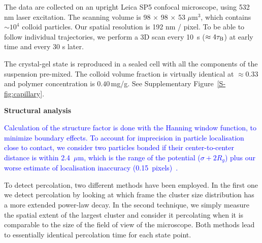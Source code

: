\documentclass[preprint,amsmath,amssymb,superscriptaddress]{revtex4-1}
\begin{document}
The data are collected on an upright Leica SP5 confocal microscope, using 532 nm laser excitation. The scanning volume is 98 $\times$ 98 $\times$ 53 $\mu$m$^3$, which contains $\sim 10^4$ colloid particles. Our spatial resolution is 192 nm / pixel. To be able to follow individual trajectories, we perform a 3D scan every 10~s ($\approx 4\tau_{\rm B}$) at early time and every 30 s later.


The crystal-gel state is reproduced in a sealed cell with all the components of the suspension pre-mixed. The colloid volume fraction is virtually identical at $\approx 0.33$ and polymer concentration is $0.40\,$mg/g. See Supplementary Figure~\ref{S-fig:capillary}.





%

\noindent
{\bf Structural analysis}

\textcolor{blue}{Calculation of the structure factor is done with the Hanning window function, to minimize boundary effects. To account for imprecision in particle localisation close to contact, we consider two particles bonded if their center-to-center distance is within 2.4~$\mu$m, which is the range of the potential ($\sigma+2R_g$) plus our worse estimate of localisation inaccuracy (0.15~pixels)~\cite{Leocmach2013}.}

To detect percolation, two different methods have been employed. In the first one we detect percolation
by looking at which frame the cluster size distribution has a more extended power-law decay. In the second technique,
we simply measure the spatial extent of the largest cluster and consider it percolating when it is comparable to the
size of the field of view of the microscope. Both methods lead to essentially identical percolation time for each state point.
\end{document}
